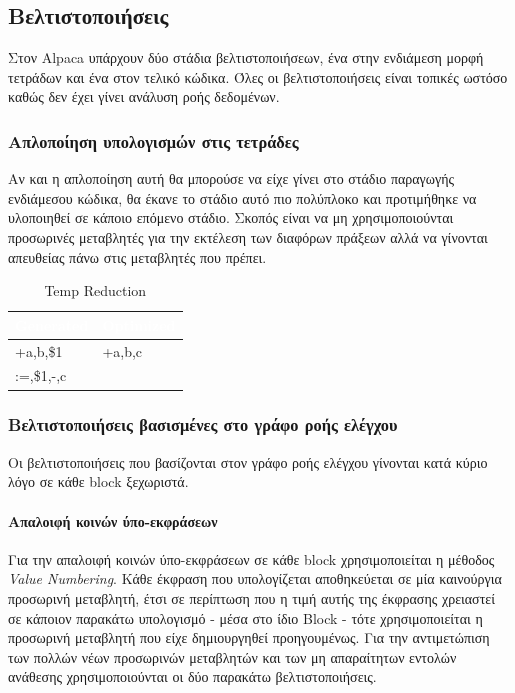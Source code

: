 \documentclass[12pt]{article}
\begin{document}
\subsection{Βελτιστοποιήσεις}
Στον Alpaca υπάρχουν δύο στάδια βελτιστοποιήσεων, ένα στην ενδιάμεση μορφή τετράδων και ένα στον τελικό κώδικα. Όλες οι βελτιστοποιήσεις είναι τοπικές ωστόσο καθώς δεν έχει γίνει ανάλυση ροής δεδομένων.
\subsubsection{Απλοποίηση υπολογισμών στις τετράδες}
Αν και η απλοποίηση αυτή θα μπορούσε να είχε γίνει στο στάδιο παραγωγής ενδιάμεσου κώδικα, θα έκανε το στάδιο αυτό πιο πολύπλοκο και προτιμήθηκε να υλοποιηθεί σε κάποιο επόμενο στάδιο. Σκοπός είναι να μη χρησιμοποιούνται προσωρινές μεταβλητές για την εκτέλεση των διαφόρων πράξεων αλλά να γίνονται απευθείας πάνω στις μεταβλητές που πρέπει.

\begin{table}
\centering
\begin{tabular}{|l|l|}
\hline
   \rowcolor{ablack}
    \textcolor{white}{Generated} & \textcolor{white}{Optimized} \\ \hline
    
    \rowcolor{gray}  
    +a,b,\$1 & +a,b,c \\ 
    \rowcolor{gray}    
    :=,\$1,-,c & \\
    
\hline
\end{tabular}
\caption{Temp Reduction}
\end{table}
\subsubsection{Βελτιστοποιήσεις βασισμένες στο γράφο ροής ελέγχου}
Οι βελτιστοποιήσεις που βασίζονται στον γράφο ροής ελέγχου γίνονται κατά κύριο λόγο σε κάθε block ξεχωριστά.
\paragraph{Απαλοιφή κοινών ύπο-εκφράσεων}
Για την απαλοιφή κοινών ύπο-εκφράσεων σε κάθε block χρησιμοποιείται η μέθοδος \textit{Value Numbering}. Κάθε έκφραση που υπολογίζεται αποθηκεύεται σε μία καινούργια προσωρινή μεταβλητή, έτσι σε περίπτωση που η τιμή αυτής της έκφρασης χρειαστεί σε κάποιον παρακάτω υπολογισμό - μέσα στο ίδιο Block - τότε χρησιμοποιείται η  προσωρινή μεταβλητή που είχε δημιουργηθεί προηγουμένως. Για την αντιμετώπιση των πολλών νέων προσωρινών μεταβλητών και των μη απαραίτητων εντολών ανάθεσης χρησιμοποιούνται οι δύο παρακάτω βελτιστοποιήσεις.
\end{document}

